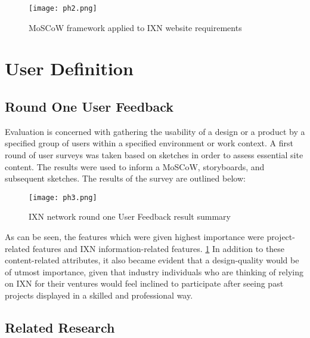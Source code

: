 \newpage

\begin{landscape}
\begin{figure}[H]
      \centering
      \texttt{[image: ph2.png]}
      \caption{MoSCoW framework applied to IXN website requirements}
 \end{figure}
 \end{landscape}

\hypertarget{user-definition}{%
\section{User Definition}\label{user-definition}}

\hypertarget{round-one-user-feedback}{%
\subsection{Round One User Feedback}\label{round-one-user-feedback}}

Evaluation is concerned with gathering the usability of a design or a
product by a specified group of users within a specified environment or
work context. A first round of user surveys was taken based on sketches
in order to assess essential site content. The results were used to
inform a MoSCoW, storyboards, and subsequent sketches. The results of
the survey are outlined below:

\begin{figure}[H]
      \centering
      \texttt{[image: ph3.png]}
      \caption{IXN network round one User Feedback result summary}
\label{userfeedback}
 \end{figure}

As can be seen, the features which were given highest importance were
project-related features and IXN information-related features.
\ref{userfeedback} In addition to these content-related attributes, it
also became evident that a design-quality would be of utmost importance,
given that industry individuals who are thinking of relying on IXN for
their ventures would feel inclined to participate after seeing past
projects displayed in a skilled and professional way.

\hypertarget{related-research}{%
\subsection{Related Research}\label{related-research}}

